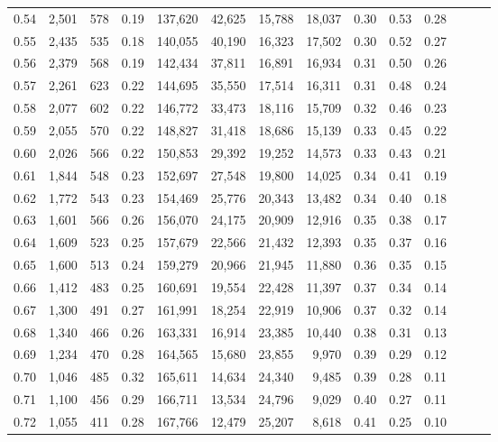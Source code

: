 \begin{tabular}{rrrrrrrrrrrrrr}
0.54 &  2,501 &  578 &  0.19 &  137,620 &   42,625 &  15,788 &  18,037 &  0.30 &  0.53 &      0.28 \\
0.55 &  2,435 &  535 &  0.18 &  140,055 &   40,190 &  16,323 &  17,502 &  0.30 &  0.52 &      0.27 \\
0.56 &  2,379 &  568 &  0.19 &  142,434 &   37,811 &  16,891 &  16,934 &  0.31 &  0.50 &      0.26 \\
0.57 &  2,261 &  623 &  0.22 &  144,695 &   35,550 &  17,514 &  16,311 &  0.31 &  0.48 &      0.24 \\
0.58 &  2,077 &  602 &  0.22 &  146,772 &   33,473 &  18,116 &  15,709 &  0.32 &  0.46 &      0.23 \\
0.59 &  2,055 &  570 &  0.22 &  148,827 &   31,418 &  18,686 &  15,139 &  0.33 &  0.45 &      0.22 \\
0.60 &  2,026 &  566 &  0.22 &  150,853 &   29,392 &  19,252 &  14,573 &  0.33 &  0.43 &      0.21 \\
0.61 &  1,844 &  548 &  0.23 &  152,697 &   27,548 &  19,800 &  14,025 &  0.34 &  0.41 &      0.19 \\
0.62 &  1,772 &  543 &  0.23 &  154,469 &   25,776 &  20,343 &  13,482 &  0.34 &  0.40 &      0.18 \\
0.63 &  1,601 &  566 &  0.26 &  156,070 &   24,175 &  20,909 &  12,916 &  0.35 &  0.38 &      0.17 \\
0.64 &  1,609 &  523 &  0.25 &  157,679 &   22,566 &  21,432 &  12,393 &  0.35 &  0.37 &      0.16 \\
0.65 &  1,600 &  513 &  0.24 &  159,279 &   20,966 &  21,945 &  11,880 &  0.36 &  0.35 &      0.15 \\
0.66 &  1,412 &  483 &  0.25 &  160,691 &   19,554 &  22,428 &  11,397 &  0.37 &  0.34 &      0.14 \\
0.67 &  1,300 &  491 &  0.27 &  161,991 &   18,254 &  22,919 &  10,906 &  0.37 &  0.32 &      0.14 \\
0.68 &  1,340 &  466 &  0.26 &  163,331 &   16,914 &  23,385 &  10,440 &  0.38 &  0.31 &      0.13 \\
0.69 &  1,234 &  470 &  0.28 &  164,565 &   15,680 &  23,855 &   9,970 &  0.39 &  0.29 &      0.12 \\
0.70 &  1,046 &  485 &  0.32 &  165,611 &   14,634 &  24,340 &   9,485 &  0.39 &  0.28 &      0.11 \\
0.71 &  1,100 &  456 &  0.29 &  166,711 &   13,534 &  24,796 &   9,029 &  0.40 &  0.27 &      0.11 \\
0.72 &  1,055 &  411 &  0.28 &  167,766 &   12,479 &  25,207 &   8,618 &  0.41 &  0.25 &      0.10 \\

\end{tabular}
